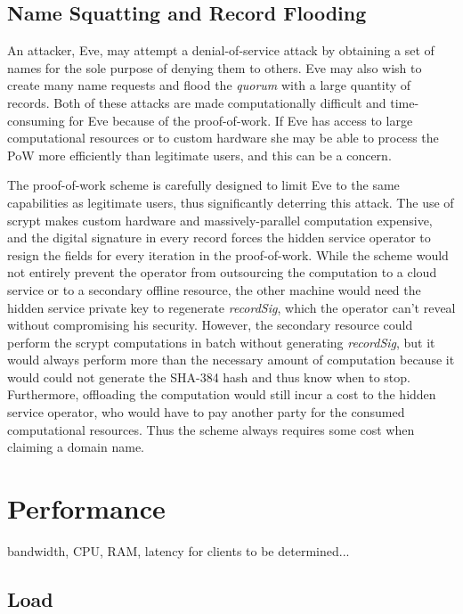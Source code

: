 \subsection{Name Squatting and Record Flooding}

An attacker, Eve, may attempt a denial-of-service attack by obtaining a set of names for the sole purpose of denying them to others. Eve may also wish to create many name requests and flood the \emph{quorum} with a large quantity of records. Both of these attacks are made computationally difficult and time-consuming for Eve because of the proof-of-work. If Eve has access to large computational resources or to custom hardware she may be able to process the PoW more efficiently than legitimate users, and this can be a concern.

The proof-of-work scheme is carefully designed to limit Eve to the same capabilities as legitimate users, thus significantly deterring this attack. The use of scrypt makes custom hardware and massively-parallel computation expensive, and the digital signature in every record forces the hidden service operator to resign the fields for every iteration in the proof-of-work. While the scheme would not entirely prevent the operator from outsourcing the computation to a cloud service or to a secondary offline resource, the other machine would need the hidden service private key to regenerate \emph{recordSig}, which the operator can't reveal without compromising his security. However, the secondary resource could perform the scrypt computations in batch without generating \emph{recordSig}, but it would always perform more than the necessary amount of computation because it would could not generate the SHA-384 hash and thus know when to stop. Furthermore, offloading the computation would still incur a cost to the hidden service operator, who would have to pay another party for the consumed computational resources. Thus the scheme always requires some cost when claiming a domain name.

\section{Performance}

bandwidth, CPU, RAM, latency for clients to be determined...

\subsection{Load}

